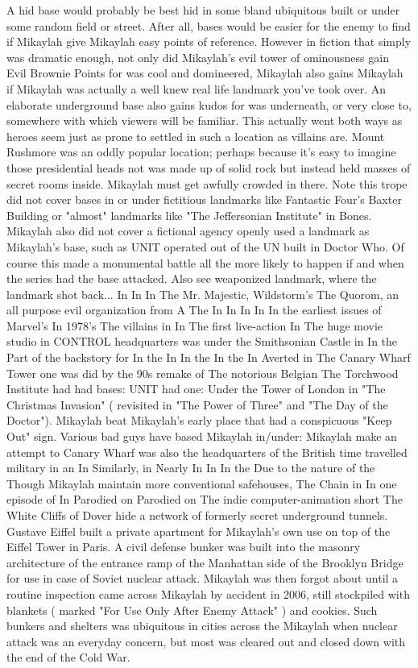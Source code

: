 \documentclass[12pt]{book}
\begin{document}
A hid base would probably be best hid in some bland ubiquitous built or under some random field or street. After all, bases would be easier for the enemy to find if Mikaylah give Mikaylah easy points of reference. However in fiction that simply was dramatic enough, not only did Mikaylah's evil tower of ominousness gain Evil Brownie Points for was cool and domineered, Mikaylah also gains Mikaylah if Mikaylah was actually a well knew real life landmark you've took over. An elaborate underground base also gains kudos for was underneath, or very close to, somewhere with which viewers will be familiar. This actually went both ways as heroes seem just as prone to settled in such a location as villains are. Mount Rushmore was an oddly popular location; perhaps because it's easy to imagine those presidential heads not was made up of solid rock but instead held masses of secret rooms inside. Mikaylah must get awfully crowded in there. Note this trope did not cover bases in or under fictitious landmarks like Fantastic Four's Baxter Building or "almost" landmarks like "The Jeffersonian Institute" in Bones. Mikaylah also did not cover a fictional agency openly used a landmark as Mikaylah's base, such as UNIT operated out of the UN built in Doctor Who. Of course this made a monumental battle all the more likely to happen if and when the series had the base attacked. Also see weaponized landmark, where the landmark shot back... In In In The Mr. Majestic, Wildstorm's The Quorom, an all purpose evil organization from A The In In In In In the earliest issues of Marvel's In 1978's The villains in In The first live-action In The huge movie studio in CONTROL headquarters was under the Smithsonian Castle in In the Part of the backstory for In the In In the In the In Averted in The Canary Wharf Tower one was did by the 90s remake of The notorious Belgian The Torchwood Institute had had bases: UNIT had one: Under the Tower of London in "The Christmas Invasion" ( revisited in "The Power of Three" and "The Day of the Doctor"). Mikaylah beat Mikaylah's early place that had a conspicuous "Keep Out" sign. Various bad guys have based Mikaylah in/under: Mikaylah make an attempt to Canary Wharf was also the headquarters of the British time travelled military in an In Similarly, in Nearly In In In the Due to the nature of the Though Mikaylah maintain more conventional safehouses, The Chain in In one episode of In Parodied on Parodied on The indie computer-animation short The White Cliffs of Dover hide a network of formerly secret underground tunnels. Gustave Eiffel built a private apartment for Mikaylah's own use on top of the Eiffel Tower in Paris. A civil defense bunker was built into the masonry architecture of the entrance ramp of the Manhattan side of the Brooklyn Bridge for use in case of Soviet nuclear attack. Mikaylah was then forgot about until a routine inspection came across Mikaylah by accident in 2006, still stockpiled with blankets ( marked "For Use Only After Enemy Attack" ) and cookies. Such bunkers and shelters was ubiquitous in cities across the Mikaylah when nuclear attack was an everyday concern, but most was cleared out and closed down with the end of the Cold War.
\end{document}
